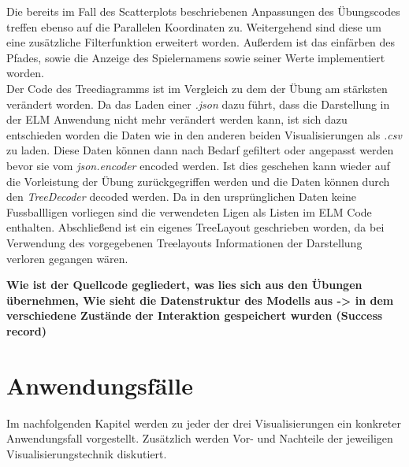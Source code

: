\documentclass[usegeometry=true]{scrartcl}
\begin{document}
Die bereits im Fall des Scatterplots beschriebenen Anpassungen des Übungscodes treffen ebenso auf die Parallelen Koordinaten zu. Weitergehend sind diese um eine zusätzliche Filterfunktion erweitert worden. Außerdem ist das einfärben des Pfades, sowie die Anzeige des Spielernamens sowie seiner Werte implementiert worden.\\

Der Code des Treediagramms ist im Vergleich zu dem der Übung am stärksten verändert worden. Da das Laden einer \textit{.json} dazu führt, dass die Darstellung in der ELM Anwendung nicht mehr verändert werden kann, ist sich dazu entschieden worden die Daten wie in den anderen beiden Visualisierungen als \textit{.csv} zu laden. Diese Daten können dann nach Bedarf gefiltert oder angepasst werden bevor sie vom \textit{json.encoder} encoded werden. Ist dies geschehen kann wieder auf die Vorleistung der Übung zurückgegriffen werden und die Daten können durch den \textit{TreeDecoder} decoded werden. Da in den ursprünglichen Daten keine Fussballligen vorliegen sind die verwendeten Ligen als Listen im ELM Code enthalten. Abschließend ist ein eigenes TreeLayout geschrieben worden, da bei Verwendung des vorgegebenen Treelayouts Informationen der Darstellung verloren gegangen wären.



\textbf{Wie ist der Quellcode gegliedert, was lies sich aus den Übungen übernehmen, Wie sieht die Datenstruktur des Modells aus -> in dem verschiedene Zustände der Interaktion gespeichert wurden (Success record)}

\section{Anwendungsfälle}

Im nachfolgenden Kapitel werden zu jeder der drei Visualisierungen ein konkreter Anwendungsfall vorgestellt. Zusätzlich werden Vor- und Nachteile der jeweiligen Visualisierungstechnik diskutiert.
\end{document}
